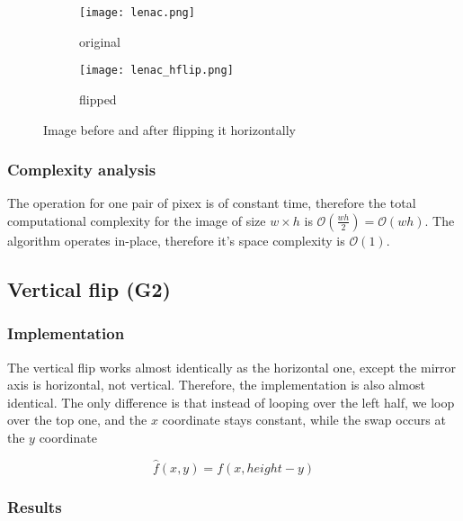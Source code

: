\documentclass[12pt]{article}
\begin{document}
\begin{figure}[H]\centering
    \begin{subfigure}[t]{\subfiguresize}\centering
        \texttt{[image: lenac.png]}
        \caption{original}
    \end{subfigure}
    \hspace{.05\textwidth}
    \begin{subfigure}[t]{\subfiguresize}\centering
        \texttt{[image: lenac\_hflip.png]}
        \caption{flipped}
    \end{subfigure}
    \caption{Image before and after flipping it horizontally}
\end{figure}

\subsubsection{Complexity analysis}

The operation for one pair of pixex is of constant time,
therefore the total computational complexity for the image of size $w \times h$ is $\mathcal{O}(\frac{wh}{2}) = \mathcal{O}(wh)$.
The algorithm operates in-place, therefore it's space complexity is $\mathcal{O}(1)$.

\vspace{5em}
\pagebreak[3]
\subsection{Vertical flip (G2)}

\subsubsection{Implementation}

The vertical flip works almost identically as the horizontal one,
except the mirror axis is horizontal, not vertical.
Therefore, the implementation is also almost identical.
The only difference is that instead of looping over the left half,
we loop over the top one, and the $x$ coordinate stays constant,
while the swap occurs at the $y$ coordinate

\begin{equation}
    \hat{f}(x,y) = f(x, height - y)
\end{equation}

\subsubsection{Results}
\end{document}
